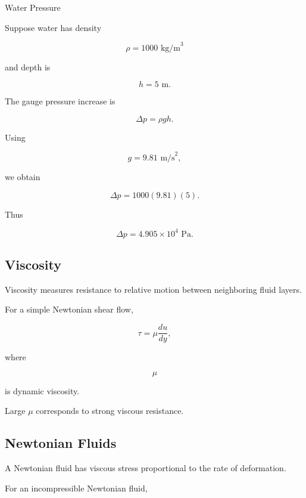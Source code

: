 \begin{workedexamplebox}{Water Pressure}

Suppose water has density

\[
\rho=1000\text{ kg/m}^3
\]

and depth is

\[
h=5\text{ m}.
\]

The gauge pressure increase is

\[
\Delta p
=
\rho gh.
\]

Using

\[
g=9.81\text{ m/s}^2,
\]

we obtain

\[
\Delta p
=
1000(9.81)(5).
\]

Thus

\begin{answerbox}
\[
\boxed{
\Delta p
=
4.905\times10^4\text{ Pa}.
}
\]
\end{answerbox}

\end{workedexamplebox}

\subsection{Viscosity}
\label{subsec:fluid-viscosity}

Viscosity measures resistance to relative motion between neighboring fluid
layers.

For a simple Newtonian shear flow,

\[
\boxed{
\tau
=
\mu
\frac{du}{dy},
}
\]

where

\[
\mu
\]

is dynamic viscosity.

Large \(\mu\) corresponds to strong viscous resistance.

\subsection{Newtonian Fluids}
\label{subsec:newtonian-fluids}

A Newtonian fluid has viscous stress proportional to the rate of deformation.

For an incompressible Newtonian fluid,

